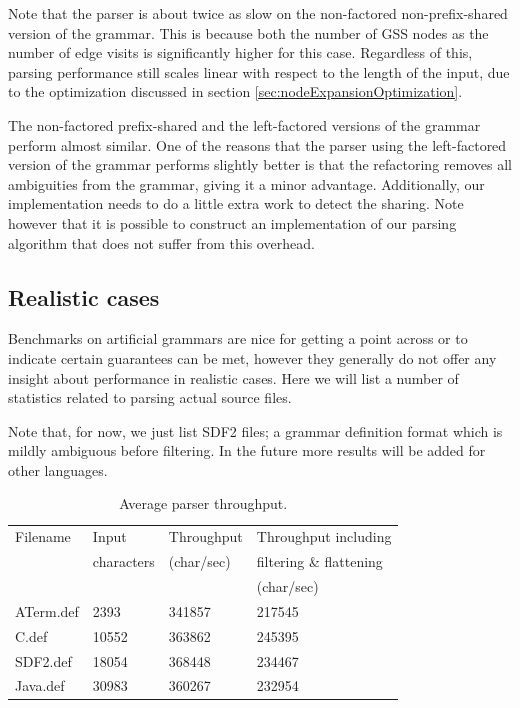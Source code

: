\documentclass[a4paper,10pt]{article}
\begin{document}
Note that the parser is about twice as slow on the non-factored non-prefix-shared version of the grammar. This is because both the number of GSS nodes as the number of edge visits is significantly higher for this case. Regardless of this, parsing performance still scales linear with respect to the length of the input, due to the optimization discussed in section \ref{sec:nodeExpansionOptimization}.

The non-factored prefix-shared and the left-factored versions of the grammar perform almost similar. One of the reasons that the parser using the left-factored version of the grammar performs slightly better is that the refactoring removes all ambiguities from the grammar, giving it a minor advantage. Additionally, our implementation needs to do a little extra work to detect the sharing. Note however that it is possible to construct an implementation of our parsing algorithm that does not suffer from this overhead.

\subsection{Realistic cases}

Benchmarks on artificial grammars are nice for getting a point across or to indicate certain guarantees can be met, however they generally do not offer any insight about performance in realistic cases. Here we will list a number of statistics related to parsing actual source files.

Note that, for now, we just list SDF2 files; a grammar definition format which is mildly ambiguous before filtering. In the future more results will be added for other languages.

\begin{table}[H]
\centering
\begin{tabular}{ | p{5em} | p{5em} | p{6em} | p{10em} |}
  \hline
  Filename & Input & Throughput & Throughput including\\
   & characters & (char/sec) & filtering \& flattening\\
   & & & (char/sec)\\
  \hline
  ATerm.def & 2393 & 341857 & 217545\\
  C.def & 10552 & 363862 & 245395\\
  SDF2.def & 18054 & 368448 & 234467\\
  Java.def & 30983 & 360267 & 232954\\
  \hline
\end{tabular}
\caption{Average parser throughput.}
\end{table}
\end{document}
